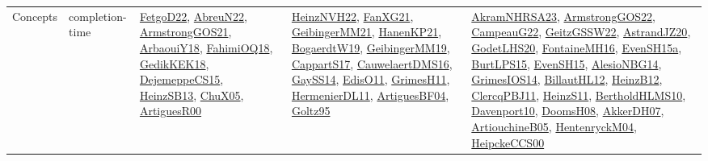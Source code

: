 {\begin{longtable}{lp{3cm}>{\raggedright}p{6cm}>{\raggedright}p{6cm}p{8cm}}
Concepts & completion-time & \href{articles/FetgoD22.pdf}{FetgoD22}\cite{FetgoD22}, \href{articles/AbreuN22.pdf}{AbreuN22}\cite{AbreuN22}, \href{papers/ArmstrongGOS21.pdf}{ArmstrongGOS21}\cite{ArmstrongGOS21}, \href{papers/ArbaouiY18.pdf}{ArbaouiY18}\cite{ArbaouiY18}, \href{articles/FahimiOQ18.pdf}{FahimiOQ18}\cite{FahimiOQ18}, \href{articles/GedikKEK18.pdf}{GedikKEK18}\cite{GedikKEK18}, \href{papers/DejemeppeCS15.pdf}{DejemeppeCS15}\cite{DejemeppeCS15}, \href{articles/HeinzSB13.pdf}{HeinzSB13}\cite{HeinzSB13}, \href{papers/ChuX05.pdf}{ChuX05}\cite{ChuX05}, \href{articles/ArtiguesR00.pdf}{ArtiguesR00}\cite{ArtiguesR00} & \href{articles/HeinzNVH22.pdf}{HeinzNVH22}\cite{HeinzNVH22}, \href{articles/FanXG21.pdf}{FanXG21}\cite{FanXG21}, \href{papers/GeibingerMM21.pdf}{GeibingerMM21}\cite{GeibingerMM21}, \href{papers/HanenKP21.pdf}{HanenKP21}\cite{HanenKP21}, \href{papers/BogaerdtW19.pdf}{BogaerdtW19}\cite{BogaerdtW19}, \href{papers/GeibingerMM19.pdf}{GeibingerMM19}\cite{GeibingerMM19}, \href{papers/CappartS17.pdf}{CappartS17}\cite{CappartS17}, \href{papers/CauwelaertDMS16.pdf}{CauwelaertDMS16}\cite{CauwelaertDMS16}, \href{papers/GaySS14.pdf}{GaySS14}\cite{GaySS14}, \href{papers/EdisO11.pdf}{EdisO11}\cite{EdisO11}, \href{papers/GrimesH11.pdf}{GrimesH11}\cite{GrimesH11}, \href{papers/HermenierDL11.pdf}{HermenierDL11}\cite{HermenierDL11}, \href{papers/ArtiguesBF04.pdf}{ArtiguesBF04}\cite{ArtiguesBF04}, \href{papers/Goltz95.pdf}{Goltz95}\cite{Goltz95} & \href{articles/AkramNHRSA23.pdf}{AkramNHRSA23}\cite{AkramNHRSA23}, \href{papers/ArmstrongGOS22.pdf}{ArmstrongGOS22}\cite{ArmstrongGOS22}, \href{articles/CampeauG22.pdf}{CampeauG22}\cite{CampeauG22}, \href{papers/GeitzGSSW22.pdf}{GeitzGSSW22}\cite{GeitzGSSW22}, \href{articles/AstrandJZ20.pdf}{AstrandJZ20}\cite{AstrandJZ20}, \href{papers/GodetLHS20.pdf}{GodetLHS20}\cite{GodetLHS20}, \href{papers/FontaineMH16.pdf}{FontaineMH16}\cite{FontaineMH16}, \href{articles/EvenSH15a.pdf}{EvenSH15a}\cite{EvenSH15a}, \href{papers/BurtLPS15.pdf}{BurtLPS15}\cite{BurtLPS15}, \href{papers/EvenSH15.pdf}{EvenSH15}\cite{EvenSH15}, \href{papers/AlesioNBG14.pdf}{AlesioNBG14}\cite{AlesioNBG14}, \href{articles/GrimesIOS14.pdf}{GrimesIOS14}\cite{GrimesIOS14}, \href{papers/BillautHL12.pdf}{BillautHL12}\cite{BillautHL12}, \href{papers/HeinzB12.pdf}{HeinzB12}\cite{HeinzB12}, \href{papers/ClercqPBJ11.pdf}{ClercqPBJ11}\cite{ClercqPBJ11}, \href{papers/HeinzS11.pdf}{HeinzS11}\cite{HeinzS11}, \href{papers/BertholdHLMS10.pdf}{BertholdHLMS10}\cite{BertholdHLMS10}, \href{papers/Davenport10.pdf}{Davenport10}\cite{Davenport10}, \href{papers/DoomsH08.pdf}{DoomsH08}\cite{DoomsH08}, \href{papers/AkkerDH07.pdf}{AkkerDH07}\cite{AkkerDH07}, \href{papers/ArtiouchineB05.pdf}{ArtiouchineB05}\cite{ArtiouchineB05}, \href{papers/HentenryckM04.pdf}{HentenryckM04}\cite{HentenryckM04}, \href{articles/HeipckeCCS00.pdf}{HeipckeCCS00}\cite{HeipckeCCS00}\\

\end{longtable}}
